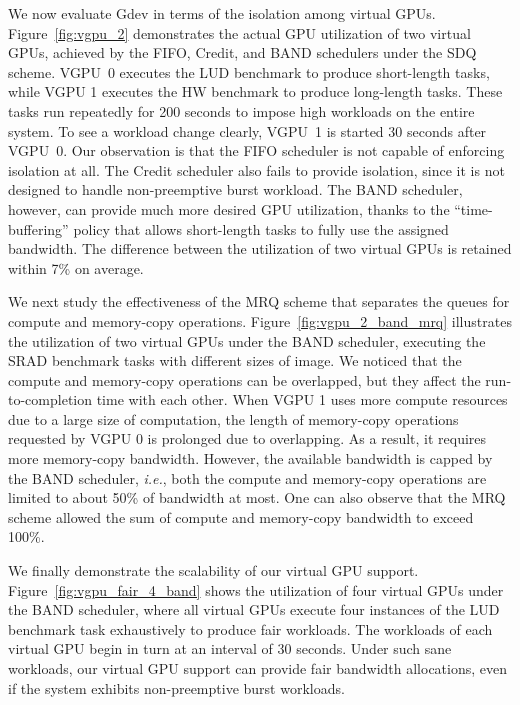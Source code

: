 We now evaluate Gdev in terms of the isolation among virtual GPUs.
Figure~\ref{fig:vgpu_2} demonstrates the actual GPU utilization of two
virtual GPUs, achieved by the FIFO, Credit, and BAND schedulers under
the SDQ scheme.
VGPU~0 executes the LUD benchmark to produce short-length tasks, while
VGPU 1 executes the HW benchmark to produce long-length tasks.
These tasks run repeatedly for 200 seconds to impose high workloads on
the entire system.
To see a workload change clearly, VGPU~1 is started 30 seconds after
VGPU~0.
Our observation is that the FIFO scheduler is not capable of enforcing
isolation at all.
The Credit scheduler also fails to provide isolation, since it is not
designed to handle non-preemptive burst workload.
The BAND scheduler, however, can provide much more desired GPU
utilization, thanks to the ``time-buffering'' policy that allows
short-length tasks to fully use the assigned bandwidth.
The difference between the utilization of two virtual GPUs is retained
within 7\% on average.

We next study the effectiveness of the MRQ scheme that separates the
queues for compute and memory-copy operations.
Figure~\ref{fig:vgpu_2_band_mrq} illustrates the utilization of two
virtual GPUs under the BAND scheduler, executing the SRAD benchmark
tasks with different sizes of image.
We noticed that the compute and memory-copy operations can be
overlapped, but they affect the run-to-completion time with each other.
When VGPU 1 uses more compute resources due to a large size of
computation, the length of memory-copy operations requested by VGPU 0 is
prolonged due to overlapping.
As a result, it requires more memory-copy bandwidth.
However, the available bandwidth is capped by the BAND scheduler,
\textit{i.e.}, both the compute and memory-copy operations are limited 
to about 50\% of bandwidth at most.
One can also observe that the MRQ scheme allowed the sum of compute and
memory-copy bandwidth to exceed 100\%.

We finally demonstrate the scalability of our virtual GPU support.
Figure~\ref{fig:vgpu_fair_4_band} shows the utilization of four virtual
GPUs under the BAND scheduler, where all virtual GPUs execute four
instances of the LUD benchmark task exhaustively to produce fair
workloads.
The workloads of each virtual GPU begin in turn at an interval of 30
seconds.
Under such sane workloads, our virtual GPU support can provide fair
bandwidth allocations, even if the system exhibits non-preemptive burst
workloads.

